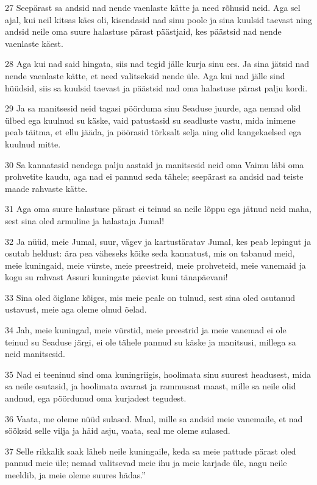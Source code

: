 \par 27 Seepärast sa andsid nad nende vaenlaste kätte ja need rõhusid neid. Aga sel ajal, kui neil kitsas käes oli, kisendasid nad sinu poole ja sina kuulsid taevast ning andsid neile oma suure halastuse pärast päästjaid, kes päästsid nad nende vaenlaste käest.
\par 28 Aga kui nad said hingata, siis nad tegid jälle kurja sinu ees. Ja sina jätsid nad nende vaenlaste kätte, et need valitseksid nende üle. Aga kui nad jälle sind hüüdsid, siis sa kuulsid taevast ja päästsid nad oma halastuse pärast palju kordi.
\par 29 Ja sa manitsesid neid tagasi pöörduma sinu Seaduse juurde, aga nemad olid ülbed ega kuulnud su käske, vaid patustasid su seadluste vastu, mida inimene peab täitma, et ellu jääda, ja pöörasid tõrksalt selja ning olid kangekaelsed ega kuulnud mitte.
\par 30 Sa kannatasid nendega palju aastaid ja manitsesid neid oma Vaimu läbi oma prohvetite kaudu, aga nad ei pannud seda tähele; seepärast sa andsid nad teiste maade rahvaste kätte.
\par 31 Aga oma suure halastuse pärast ei teinud sa neile lõppu ega jätnud neid maha, sest sina oled armuline ja halastaja Jumal!
\par 32 Ja nüüd, meie Jumal, suur, vägev ja kartustäratav Jumal, kes peab lepingut ja osutab heldust: ära pea väheseks kõike seda kannatust, mis on tabanud meid, meie kuningaid, meie vürste, meie preestreid, meie prohveteid, meie vanemaid ja kogu su rahvast Assuri kuningate päevist kuni tänapäevani!
\par 33 Sina oled õiglane kõiges, mis meie peale on tulnud, sest sina oled osutanud ustavust, meie aga oleme olnud õelad.
\par 34 Jah, meie kuningad, meie vürstid, meie preestrid ja meie vanemad ei ole teinud su Seaduse järgi, ei ole tähele pannud su käske ja manitsusi, millega sa neid manitsesid.
\par 35 Nad ei teeninud sind oma kuningriigis, hoolimata sinu suurest headusest, mida sa neile osutasid, ja hoolimata avarast ja rammusast maast, mille sa neile olid andnud, ega pöördunud oma kurjadest tegudest.
\par 36 Vaata, me oleme nüüd sulased. Maal, mille sa andsid meie vanemaile, et nad sööksid selle vilja ja häid asju, vaata, seal me oleme sulased.
\par 37 Selle rikkalik saak läheb neile kuningaile, keda sa meie pattude pärast oled pannud meie üle; nemad valitsevad meie ihu ja meie karjade üle, nagu neile meeldib, ja meie oleme suures hädas.”

